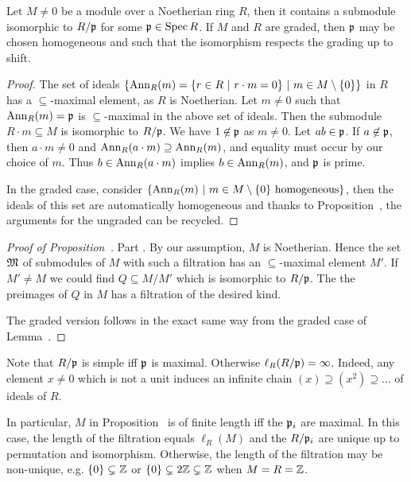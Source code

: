 \documentclass[a4paper,parskip=half,numbers=enddot, DIV=12]{scrreprt}
\begin{document}
\begin{lem}
    Let $M\neq0$ be a module over a Noetherian ring $R$,  then it contains a submodule isomorphic to $R/\mathfrak{p}$ for some $\mathfrak{p}\in \operatorname{Spec} R$. If $M$ and $R$ are graded, then $\mathfrak{p}$ may be chosen homogeneous and such that the isomorphism respects the grading up to shift.
\end{lem}
\begin{proof}
    The set of ideals $\left\{\operatorname{Ann}_R(m) = \left\{r\in R\ \middle|\  r\cdot m = 0\right\} \ \middle|\  m\in M\setminus \{0\}\right\}$ in $R$ has a $\subseteq$-maximal element, as $R$ is Noetherian. Let $m\neq 0$ such that $\operatorname{Ann}_R(m) = \mathfrak{p}$ is $\subseteq$-maximal in the above set of ideals. Then the submodule $R\cdot m \subseteq M$ is isomorphic to $R/\mathfrak{p}$. We have $1\not\in \mathfrak{p}$ as $m\neq 0$. Let $ab\in \mathfrak{p}$. If $a\not\in\mathfrak{p}$, then $a\cdot m \neq 0$ and $\operatorname{Ann}_R(a\cdot m)\supseteq \operatorname{Ann}_R(m)$, and equality must occur by our choice of $m$. Thus $b\in \operatorname{Ann}_R(a\cdot m)$ implies $b\in \operatorname{Ann}_R(m)$, and $\mathfrak{p}$ is prime.
    
    In the graded case, consider $\left\{\operatorname{Ann}_R(m)\ \middle|\  m\in M\setminus\{0\}\text{ homogeneous}\right\}$, then the ideals of this set are automatically homogeneous and thanks to Proposition~, the arguments for the ungraded can be recycled.
\end{proof}
\begin{proof}[Proof of Proposition~]
    Part . By our assumption, $M$ is Noetherian. Hence the set $\mathfrak{M}$ of submodules of $M$ with such a filtration has an $\subseteq$-maximal element $M'$. If $M'\neq M$ we could find $Q\subseteq M/M'$ which is isomorphic to $R/\mathfrak{p}$. The the preimages of $Q$ in $M$ has a filtration of the desired kind.
    
    The graded version  follows in the exact same way from the graded case of Lemma~.
\end{proof}
\begin{rem*}
    \begin{alphanumerate}
    \item 
        Note that $R/\mathfrak{p}$ is simple iff $\mathfrak{p}$ is maximal. Otherwise $\ell_R(R/\mathfrak{p}) = \infty$. Indeed, any element $x\not=0$ which is not a unit induces an infinite chain $(x)\supseteq(x^2)\supseteq\ldots$ of ideals of $R$.
    \item 
        In particular, $M$ in Proposition~ is of finite length iff the $\mathfrak{p}_i$ are maximal. In this case, the length of the filtration equals $\ell_R(M)$ and the $R/\mathfrak{p}_i$ are unique up to permutation and isomorphism. Otherwise, the length of the filtration may be non-unique, e.g. $\{0\}\subsetneq \mathbb{Z}$ or $\{0\}\subsetneq 2\mathbb{Z} \subsetneq \mathbb{Z}$ when $M=R=\mathbb{Z}$.
    \end{alphanumerate}
\end{rem*}
\end{document}
